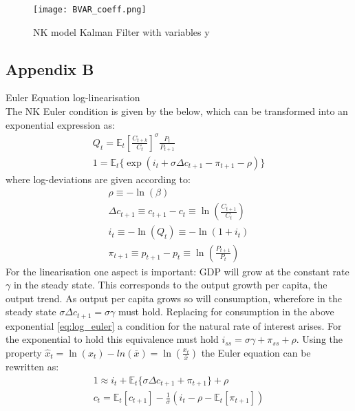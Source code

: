 \documentclass[12pt,a4paper,english]{article} %
\newcommand{\E}{\mathbb{E}} %
\begin{document}
	\begin{figure}[H]
		\begin{center}
			\texttt{[image: BVAR\_coeff.png]}
			\caption{NK model Kalman Filter with variables y}\label{fig:bvar_coef}
		\end{center}
	\end{figure}

	\pagebreak
	
	\pagebreak
	\subsection*{Appendix B} \label{appb}
	Euler Equation log-linearisation\\
	
	The NK Euler condition is given by the below, which can be transformed into an exponential expression as:
	\begin{equation}\label{eq:log_euler}
		\begin{aligned}
			Q_{t} = \E_t \left[ \frac{C_{t+k}}{C_t} \right]^\sigma \frac{P_t}{P_{t+1}} \\
			1 = \E_t \{\exp(i_t + \sigma \Delta c_{t+1} - \pi_{t+1} - \rho) \}
		\end{aligned}
	\end{equation}
	where log-deviations are given according to: 
	\begin{equation}
		\begin{aligned}
			\rho \equiv - \ln(\beta) \\
			\Delta c_{t+1} \equiv c_{t+1} - c_t \equiv \ln\left( \frac{C_{t+1}}{C_t} \right) \\
			i_t \equiv - \ln(Q_t) \equiv - \ln(1+i_t) \\
			\pi_{t+1} \equiv p_{t+1} - p_t \equiv \ln \left( \frac{P_{t+1}}{P_t} \right)
		\end{aligned}
	\end{equation}
	For the linearisation one aspect is important: GDP will grow at the constant rate $\gamma$ in the steady state. This corresponds to the output growth per capita, the output trend. As output per capita grows so will consumption, wherefore in the steady state $\sigma \Delta c_{t+1} = \sigma \gamma$ must hold. Replacing for consumption in the above exponential \eqref{eq:log_euler} a condition for the natural rate of interest arises. For the exponential to hold this equivalence must hold $i_{ss} = \sigma \gamma + \pi_{ss} + \rho$. 
	Using the property $\hat{x}_t = \ln(x_t) - ln(\bar{x}) = \ln\left(\frac{x_t}{\bar{x}}\right)$ the Euler equation can be rewritten as:
	\begin{equation}
		\begin{aligned}
			1 \approx i_t + \E_t \{\sigma \Delta c_{t+1} + \pi_{t+1} \} + \rho \\
			c_t = \E_t[c_{t+1}] - \frac{1}{\sigma} (i_t - \rho - \E_t[\pi_{t+1}])	
		\end{aligned}
	\end{equation}
\end{document}
